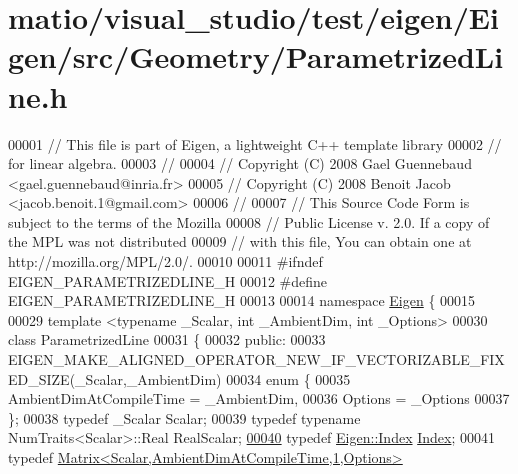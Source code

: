 \hypertarget{matio_2visual__studio_2test_2eigen_2_eigen_2src_2_geometry_2_parametrized_line_8h_source}{}\section{matio/visual\+\_\+studio/test/eigen/\+Eigen/src/\+Geometry/\+Parametrized\+Line.h}
\label{matio_2visual__studio_2test_2eigen_2_eigen_2src_2_geometry_2_parametrized_line_8h_source}

\begin{DoxyCode}
00001 \textcolor{comment}{// This file is part of Eigen, a lightweight C++ template library}
00002 \textcolor{comment}{// for linear algebra.}
00003 \textcolor{comment}{//}
00004 \textcolor{comment}{// Copyright (C) 2008 Gael Guennebaud <gael.guennebaud@inria.fr>}
00005 \textcolor{comment}{// Copyright (C) 2008 Benoit Jacob <jacob.benoit.1@gmail.com>}
00006 \textcolor{comment}{//}
00007 \textcolor{comment}{// This Source Code Form is subject to the terms of the Mozilla}
00008 \textcolor{comment}{// Public License v. 2.0. If a copy of the MPL was not distributed}
00009 \textcolor{comment}{// with this file, You can obtain one at http://mozilla.org/MPL/2.0/.}
00010 
00011 \textcolor{preprocessor}{#ifndef EIGEN\_PARAMETRIZEDLINE\_H}
00012 \textcolor{preprocessor}{#define EIGEN\_PARAMETRIZEDLINE\_H}
00013 
00014 \textcolor{keyword}{namespace }\hyperlink{namespace_eigen}{Eigen} \{ 
00015 
00029 \textcolor{keyword}{template} <\textcolor{keyword}{typename} \_Scalar, \textcolor{keywordtype}{int} \_AmbientDim, \textcolor{keywordtype}{int} \_Options>
00030 \textcolor{keyword}{class }ParametrizedLine
00031 \{
00032 \textcolor{keyword}{public}:
00033   EIGEN\_MAKE\_ALIGNED\_OPERATOR\_NEW\_IF\_VECTORIZABLE\_FIXED\_SIZE(\_Scalar,\_AmbientDim)
00034   \textcolor{keyword}{enum} \{
00035     AmbientDimAtCompileTime = \_AmbientDim,
00036     Options = \_Options
00037   \};
00038   \textcolor{keyword}{typedef} \_Scalar Scalar;
00039   \textcolor{keyword}{typedef} \textcolor{keyword}{typename} NumTraits<Scalar>::Real RealScalar;
\hyperlink{group___geometry___module_a3c9f84dd8608940282b16652a296c764}{00040}   \textcolor{keyword}{typedef} \hyperlink{namespace_eigen_a62e77e0933482dafde8fe197d9a2cfde}{Eigen::Index} \hyperlink{group___geometry___module_a3c9f84dd8608940282b16652a296c764}{Index}; 
00041   \textcolor{keyword}{typedef} \hyperlink{group___core___module}{Matrix<Scalar,AmbientDimAtCompileTime,1,Options>} 

\end{DoxyCode}
